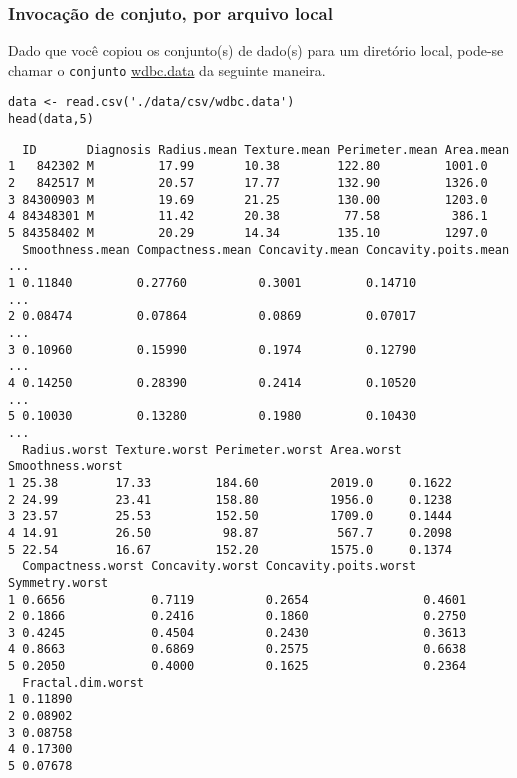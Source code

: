 \documentclass[12pt]{article}
\begin{document}
\subsubsection{Invocação de conjuto, por arquivo local}
\label{sec:orgcc0e41d}

Dado que você copiou os conjunto(s) de dado(s) para um diretório
local, pode-se chamar o \texttt{conjunto} \href{https://drive.google.com/file/d/14WFx8oXCYst\_QPySIfuii660A93xg4pg/view?usp=sharing}{wdbc.data} da seguinte maneira.

\begin{verbatim}
data <- read.csv('./data/csv/wdbc.data')
head(data,5)
\end{verbatim}

\begin{verbatim}
  ID       Diagnosis Radius.mean Texture.mean Perimeter.mean Area.mean
1   842302 M         17.99       10.38        122.80         1001.0   
2   842517 M         20.57       17.77        132.90         1326.0   
3 84300903 M         19.69       21.25        130.00         1203.0   
4 84348301 M         11.42       20.38         77.58          386.1   
5 84358402 M         20.29       14.34        135.10         1297.0   
  Smoothness.mean Compactness.mean Concavity.mean Concavity.poits.mean ...
1 0.11840         0.27760          0.3001         0.14710              ...
2 0.08474         0.07864          0.0869         0.07017              ...
3 0.10960         0.15990          0.1974         0.12790              ...
4 0.14250         0.28390          0.2414         0.10520              ...
5 0.10030         0.13280          0.1980         0.10430              ...
  Radius.worst Texture.worst Perimeter.worst Area.worst Smoothness.worst
1 25.38        17.33         184.60          2019.0     0.1622          
2 24.99        23.41         158.80          1956.0     0.1238          
3 23.57        25.53         152.50          1709.0     0.1444          
4 14.91        26.50          98.87           567.7     0.2098          
5 22.54        16.67         152.20          1575.0     0.1374          
  Compactness.worst Concavity.worst Concavity.poits.worst Symmetry.worst
1 0.6656            0.7119          0.2654                0.4601        
2 0.1866            0.2416          0.1860                0.2750        
3 0.4245            0.4504          0.2430                0.3613        
4 0.8663            0.6869          0.2575                0.6638        
5 0.2050            0.4000          0.1625                0.2364        
  Fractal.dim.worst
1 0.11890          
2 0.08902          
3 0.08758          
4 0.17300          
5 0.07678          
\end{verbatim}
\clearpage
\end{document}
